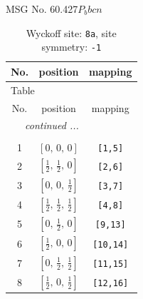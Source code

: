 \documentclass[fleqn,8pt]{jsarticle}
\begin{document}
\setcounter{MaxMatrixCols}{32}

\renewcommand{\tablename}{Table~}
\renewcommand{\figurename}{Figure~}
\begin{center}
\LARGE
MSG No. 60.427\quad$P_{b}bcn$
\end{center}
\renewcommand{\arraystretch}{1.2}
\begin{longtable}{ccc}
\caption{Wyckoff site: {\tt 8a}, site symmetry: {\tt -1}}
 \\
 \hline \hline
No. & position & mapping \\ \hline \endfirsthead

\multicolumn{2}{l}{\tablename\ \thetable{}} \\
 \hline \hline
No. & position & mapping \\ \hline \endhead

 \hline \hline
\multicolumn{2}{r}{\footnotesize\it continued ...} \\ \endfoot

 \hline \hline
\multicolumn{2}{r}{} \\ \endlastfoot

1 & $\left[ 0,\, 0,\, 0 \right]$ & {\tt [1,5]} \\ \hline
2 & $\left[ \frac{1}{2},\, \frac{1}{2},\, 0 \right]$ & {\tt [2,6]} \\ \hline
3 & $\left[ 0,\, 0,\, \frac{1}{2} \right]$ & {\tt [3,7]} \\ \hline
4 & $\left[ \frac{1}{2},\, \frac{1}{2},\, \frac{1}{2} \right]$ & {\tt [4,8]} \\ \hline
5 & $\left[ 0,\, \frac{1}{2},\, 0 \right]$ & {\tt [9,13]} \\ \hline
6 & $\left[ \frac{1}{2},\, 0,\, 0 \right]$ & {\tt [10,14]} \\ \hline
7 & $\left[ 0,\, \frac{1}{2},\, \frac{1}{2} \right]$ & {\tt [11,15]} \\ \hline
8 & $\left[ \frac{1}{2},\, 0,\, \frac{1}{2} \right]$ & {\tt [12,16]} \\
\end{longtable}
\renewcommand{\arraystretch}{1.2}
\end{document}
